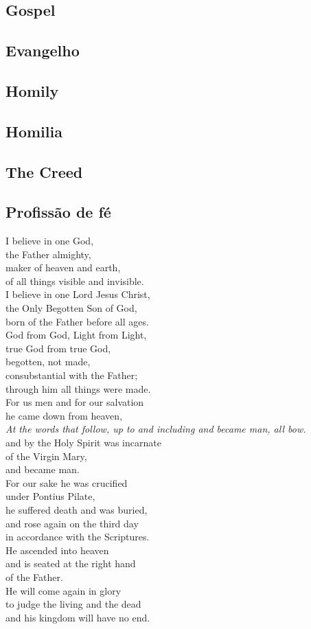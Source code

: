 \documentclass[10pt,a5]{article}
\newcommand \subsect[2] {\subsection*{#1} \switchcolumn \subsection*{#2} \switchcolumn*}
\begin{document}
\begin{paracol}{2}

 \switchcolumn



 \switchcolumn*

 \subsect{Gospel}{Evangelho}



 \switchcolumn



 \switchcolumn*

 \subsect{Homily}{Homilia}

 \subsect{The Creed}{Profiss\~ao de f\'e}
I believe in one God,\\
the Father almighty,\\
maker of heaven and earth,\\
of all things visible and invisible.\\

\noindent
I believe in one Lord Jesus Christ,\\
the Only Begotten Son of God,\\
born of the Father before all ages.\\
God from God, Light from Light,\\
true God from true God,\\
begotten, not made,\\
consubstantial with the Father;\\
through him all things were made.\\
For us men and for our salvation\\
he came down from heaven,\\
{\tiny\textit{ At the words that follow, up to and including and became man, all bow.}}\\
and by the Holy Spirit was incarnate\\
of the Virgin Mary,\\
and became man.\\
For our sake he was crucified\\
under Pontius Pilate,\\
he suffered death and was buried,\\
and rose again on the third day\\
in accordance with the Scriptures.\\
He ascended into heaven\\
and is seated at the right hand\\
of the Father.\\
He will come again in glory\\
to judge the living and the dead\\
and his kingdom will have no end.\\


\end{paracol}
\end{document}
